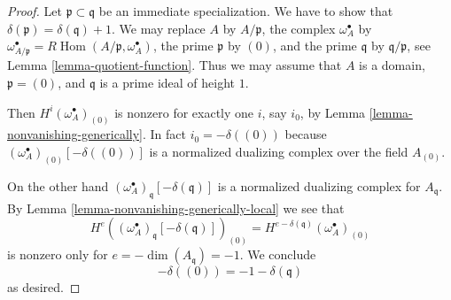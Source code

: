 \documentclass[10pt,a4paper]{amsart}
\theoremstyle{plain}
\theoremstyle{definition}
\theoremstyle{remark}
\numberwithin{equation}{subsection}
\def\Hom{\mathop{\mathrm{Hom}}\nolimits}
\begin{document}
\begin{proof}
Let $\mathfrak p \subset \mathfrak q$ be an immediate specialization.
We have to show that $\delta(\mathfrak p) = \delta(\mathfrak q) + 1$.
We may replace $A$ by $A/\mathfrak p$, the complex $\omega_A^\bullet$ by
$\omega_{A/\mathfrak p}^\bullet = R\Hom(A/\mathfrak p, \omega_A^\bullet)$,
the prime $\mathfrak p$ by $(0)$, and the prime $\mathfrak q$
by $\mathfrak q/\mathfrak p$,
see Lemma \ref{lemma-quotient-function}. Thus we may assume that
$A$ is a domain, $\mathfrak p = (0)$, and $\mathfrak q$ is a prime
ideal of height $1$.

\medskip\noindent
Then $H^i(\omega_A^\bullet)_{(0)}$ is nonzero
for exactly one $i$, say $i_0$, by Lemma \ref{lemma-nonvanishing-generically}.
In fact $i_0 = -\delta((0))$ because
$(\omega_A^\bullet)_{(0)}[-\delta((0))]$
is a normalized dualizing complex over the field $A_{(0)}$.

\medskip\noindent
On the other hand $(\omega_A^\bullet)_\mathfrak q[-\delta(\mathfrak q)]$
is a normalized dualizing complex for $A_\mathfrak q$. By
Lemma \ref{lemma-nonvanishing-generically-local}
we see that
$$
H^e((\omega_A^\bullet)_\mathfrak q[-\delta(\mathfrak q)])_{(0)} =
H^{e - \delta(\mathfrak q)}(\omega_A^\bullet)_{(0)}
$$
is nonzero only for $e = -\dim(A_\mathfrak q) = -1$.
We conclude
$$
-\delta((0)) = -1 - \delta(\mathfrak q)
$$
as desired.
\end{proof}
\end{document}
